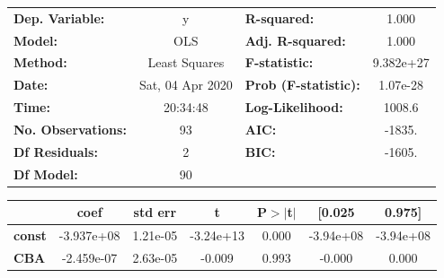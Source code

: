 \begin{center}
\begin{tabular}{lclc}
\toprule
\textbf{Dep. Variable:}    &        y         & \textbf{  R-squared:         } &     1.000   \\
\textbf{Model:}            &       OLS        & \textbf{  Adj. R-squared:    } &     1.000   \\
\textbf{Method:}           &  Least Squares   & \textbf{  F-statistic:       } & 9.382e+27   \\
\textbf{Date:}             & Sat, 04 Apr 2020 & \textbf{  Prob (F-statistic):} &  1.07e-28   \\
\textbf{Time:}             &     20:34:48     & \textbf{  Log-Likelihood:    } &    1008.6   \\
\textbf{No. Observations:} &          93      & \textbf{  AIC:               } &    -1835.   \\
\textbf{Df Residuals:}     &           2      & \textbf{  BIC:               } &    -1605.   \\
\textbf{Df Model:}         &          90      & \textbf{                     } &             \\
\bottomrule
\end{tabular}
\begin{tabular}{lcccccc}
               & \textbf{coef} & \textbf{std err} & \textbf{t} & \textbf{P$>$$|$t$|$} & \textbf{[0.025} & \textbf{0.975]}  \\
\midrule
\textbf{const} &   -3.937e+08  &     1.21e-05     & -3.24e+13  &         0.000        &    -3.94e+08    &    -3.94e+08     \\
\textbf{CBA}    &   -2.459e-07  &     2.63e-05     &    -0.009  &         0.993        &       -0.000    &        0.000     \\
\end{tabular}
\end{center}
